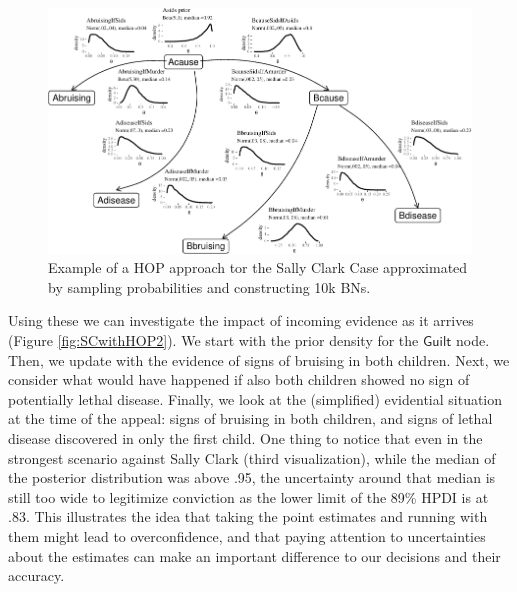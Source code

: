 \documentclass[
  10pt,
  dvipsnames,enabledeprecatedfontcommands]{scrartcl}
\newcommand{\s}[1]{\mbox{$\mathsf{#1}$}}
\begin{document}
\begin{figure}

\begin{center}\includegraphics[width=1.6\linewidth,height=2\textheight,angle=90]{chapter-outline_files/figure-latex/SCwithHOP-1} \end{center}

\caption{Example of a HOP approach tor the Sally Clark Case  approximated by sampling probabilities  and constructing 10k BNs.}
\label{fig:SCwithHOP}
\end{figure}

Using these we can investigate the impact of incoming evidence as it
arrives (Figure \ref{fig:SCwithHOP2}). We start with the prior density
for the \s{Guilt} node. Then, we update with the evidence of signs of
bruising in both children. Next, we consider what would have happened if
also both children showed no sign of potentially lethal disease.
Finally, we look at the (simplified) evidential situation at the time of
the appeal: signs of bruising in both children, and signs of lethal
disease discovered in only the first child. One thing to notice that
even in the strongest scenario against Sally Clark (third
visualization), while the median of the posterior distribution was above
.95, the uncertainty around that median is still too wide to legitimize
conviction as the lower limit of the 89\% HPDI is at .83. This
illustrates the idea that taking the point estimates and running with
them might lead to overconfidence, and that paying attention to
uncertainties about the estimates can make an important difference to
our decisions and their accuracy.
\end{document}
